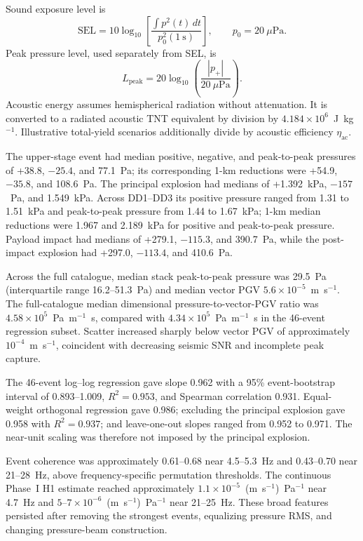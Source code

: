 \documentclass[]{seismica}
\begin{document}
Sound exposure level is
\begin{equation}
 \mathrm{SEL}=10\log_{10}\left[
 \frac{\int p^2(t)\,dt}{p_0^2(1~\mathrm{s})}\right],
 \qquad p_0=20~\mu\mathrm{Pa}.
\end{equation}
Peak pressure level, used separately from SEL, is
\begin{equation}
 L_{\mathrm{peak}}=20\log_{10}\left(\frac{|p_+|}{20~\mu\mathrm{Pa}}\right).
\end{equation}
Acoustic energy assumes hemispherical radiation without attenuation. It is
converted to a radiated acoustic TNT equivalent by division by
$4.184\times10^6$~J~kg$^{-1}$. Illustrative total-yield scenarios additionally
divide by acoustic efficiency $\eta_{\mathrm{ac}}$.

The upper-stage event had median positive, negative, and peak-to-peak
pressures of +38.8, $-25.4$, and 77.1~Pa; its corresponding 1-km reductions
were +54.9, $-35.8$, and 108.6~Pa. The principal explosion had medians of
+1.392~kPa, $-157$~Pa, and 1.549~kPa. Across DD1--DD3 its positive pressure
ranged from 1.31 to 1.51~kPa and peak-to-peak pressure from 1.44 to 1.67~kPa;
1-km median reductions were 1.967 and 2.189~kPa for positive and peak-to-peak
pressure. Payload impact had medians of +279.1, $-115.3$, and 390.7~Pa, while
the post-impact explosion had +297.0, $-113.4$, and 410.6~Pa.

Across the full catalogue, median stack peak-to-peak pressure was 29.5~Pa
(interquartile range 16.2--51.3~Pa) and median vector PGV
$5.6\times10^{-5}$~m~s$^{-1}$. The full-catalogue median dimensional
pressure-to-vector-PGV ratio was
$4.58\times10^5$~Pa~m$^{-1}$~s, compared with
$4.34\times10^5$~Pa~m$^{-1}$~s in the 46-event regression subset. Scatter
increased sharply below vector PGV of approximately $10^{-4}$~m~s$^{-1}$,
coincident with decreasing seismic SNR and incomplete peak capture.

The 46-event log--log regression gave slope 0.962 with a 95\% event-bootstrap
interval of 0.893--1.009, $R^2=0.953$, and Spearman correlation 0.931.
Equal-weight orthogonal regression gave 0.986; excluding the principal
explosion gave 0.958 with $R^2=0.937$; and leave-one-out slopes ranged from
0.952 to 0.971. The near-unit scaling was therefore not imposed by the
principal explosion.

Event coherence was approximately 0.61--0.68 near 4.5--5.3~Hz and
0.43--0.70 near 21--28~Hz, above frequency-specific permutation thresholds.
The continuous Phase~I H1 estimate reached approximately
$1.1\times10^{-5}$~(m~s$^{-1}$)~Pa$^{-1}$ near 4.7~Hz and
$5$--$7\times10^{-6}$~(m~s$^{-1}$)~Pa$^{-1}$ near 21--25~Hz. These broad
features persisted after removing the strongest events, equalizing pressure
RMS, and changing pressure-beam construction.
\end{document}
